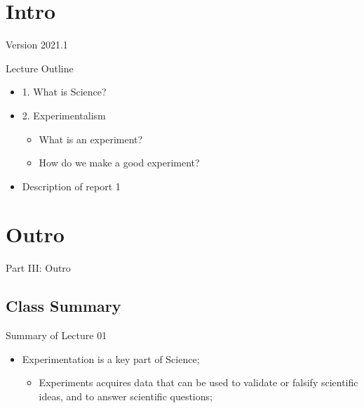 \documentclass{beamer}
\subtitle[Experimentalism]{Topic 01 - What is an experiment?}
\begin{document}
\begin{CJK}{UTF8}{ipxm}

\section{Intro}
\begin{frame}
  \maketitle

  \vfill

  \hfill Version 2021.1
\end{frame}

\begin{frame}{Lecture Outline}
  \begin{itemize}
    \item 1. What is Science?\bigskip

    \item 2. Experimentalism
    \begin{itemize}
      \item What is an experiment?
      \item How do we make a good experiment?
    \end{itemize}\bigskip

    \item Description of report 1
  \end{itemize}
\end{frame}




\section{Outro}

\begin{frame}
  \begin{center}
    Part III: Outro
  \end{center}
\end{frame}

\subsection{Class Summary}
\begin{frame}{Summary of Lecture 01}
  \begin{itemize}
    \item Experimentation is a key part of Science;
    \begin{itemize}
      \item Experiments acquires data that can be used to validate or falsify scientific ideas, and to answer scientific questions;
    \end{itemize}
    \bigskip


\end{itemize}
\end{frame}
\end{CJK}
\end{document}

